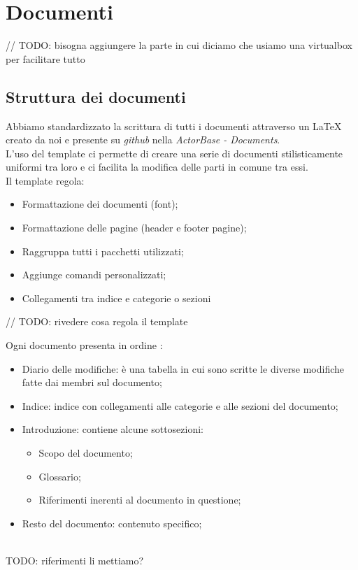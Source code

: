 \section{Documenti}
	// TODO: bisogna aggiungere la parte in cui diciamo che usiamo una virtualbox per facilitare tutto

\subsection{Struttura dei documenti}
Abbiamo standardizzato la scrittura di tutti i documenti attraverso un  \LaTeX\xspace creato da noi e presente su \textit{github} nella  \textit{ActorBase - Documents}.\\
L'uso del template ci permette di creare una serie di documenti stilisticamente uniformi tra loro e ci facilita la modifica delle parti in comune tra essi.\\
Il template regola:
\begin{itemize}
\item Formattazione dei documenti (font);
\item Formattazione delle pagine (header e footer pagine);
\item Raggruppa tutti i pacchetti utilizzati;
\item Aggiunge comandi personalizzati;
\item Collegamenti tra indice e categorie o sezioni
\end{itemize}
	// TODO: rivedere cosa regola il template

Ogni documento presenta in ordine :
\begin{itemize}
\item Diario delle modifiche: è una tabella in cui sono scritte le diverse modifiche fatte dai membri sul documento;
\item Indice: indice con collegamenti alle categorie e alle sezioni del documento;
\item Introduzione: contiene alcune sottosezioni:
	\begin{itemize}
	\item Scopo del documento;
	\item Glossario;
	\item Riferimenti inerenti al documento in questione;
	\end{itemize}
\item Resto del documento: contenuto specifico;
\end{itemize}
	\\TODO: riferimenti li mettiamo?


